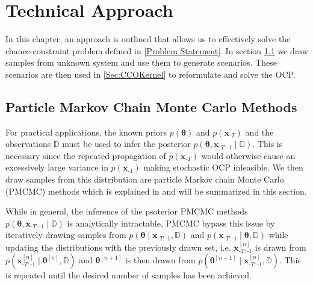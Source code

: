 \chapter{Technical Approach}

In this chapter, an approach is outlined that allows us to effectively solve the chance-constraint problem defined in \ref{Problem Statement}. In section \ref{PGibbs sampling} we draw samples from unknown system and use them to generate scenarios. These scenarios are then used in \ref{Sec:CCOKernel} to reformulate and solve the OCP.

\section{Particle Markov Chain Monte Carlo Methods} \label{PGibbs sampling}

For practical applications, the known priors $p(\boldsymbol{\theta})$ and $p(\boldsymbol{x}_{\text{-}T})$ and the observations $\mathbb{D}$ must be used to infer the posterior $p(\boldsymbol{\theta}, \boldsymbol{x}_{\text{-}T:\text{-}1}\mid \mathbb{D})$. This is necessary since the repeated propagation of $p(\boldsymbol{x}_{\text{-}T})$ would otherwise cause an excessively large variance in $p(\boldsymbol{x}_{\text{-}1})$ making stochastic OCP infeasible. We then draw samples from this distribution are particle Markov chain Monte Carlo (PMCMC) methods which is explained in \cite{Andrieu_10} and will be summarized in this section.

While in general, the inference of the psoterior PMCMC methods $p(\boldsymbol{\theta}, \boldsymbol{x}_{\text{-}T:\text{-}1}\mid \mathbb{D})$ is analytically intractable, PMCMC bypass this issue by iteratively drawing samples from $p(\boldsymbol{\theta} \mid \boldsymbol{x}_{\text{-}T:\text{-}1}, \mathbb{D})$ and $p(\boldsymbol{x}_{\text{-}T:\text{-}1}\mid \boldsymbol{\theta}, \mathbb{D})$ while updating the distributions with the previously drawn set, i.e. $\boldsymbol{x}_{\text{-}T:\text{-}1}^{[n]}$ is drawn from $p(\boldsymbol{x}_{\text{-}T:\text{-}1}^{[n]}\mid \boldsymbol{\theta}^{[n]}, \mathbb{D})$ and $\boldsymbol{\theta}^{[n+1]}$ is then drawn from $p(\boldsymbol{\theta}^{[n+1]}\mid \boldsymbol{x}_{\text{-}T:\text{-}1}^{[n]}, \mathbb{D})$. This is repeated until the desired number of samples has been achieved.

